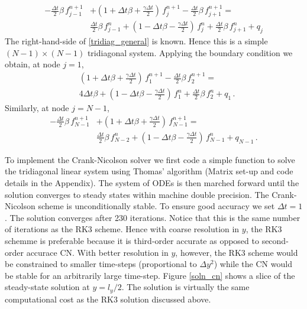 \documentclass[11pt]{article}
\newcommand{\per}{\, .}
\begin{document}
\begin{enumerate}[label=(\alph*)]
        \begin{align}
            \label{tridiag_general}
            -\tfrac{\Delta t}{2}\beta\,f_{j-1}^{n+1} & + \left(1 + \Delta t \beta + \tfrac{\gamma \Delta t}{2}\right)\,f_j^{n+1} -\tfrac{\Delta t}{2}\beta\,f_{j+1}^{n+1} =   \nonumber \\ &\tfrac{\Delta t}{2}\beta\,f_{j-1}^{n}+\left(1 - \Delta t \beta - \tfrac{\gamma \Delta t}{2}\right)\,f_j^{n} + \tfrac{\Delta t}{2}\beta\,f_{j+1}^{n} + q_j
        \end{align}
        The right-hand-side of \eqref{tridiag_general} is known. Hence this is a simple $(N-1)\times(N-1)$ tridiagonal system. Applying the boundary condition we obtain, at node $j=1$,
        \begin{align}
            \label{tridiag_general_1}
            &  \left(1 + \Delta t \beta + \tfrac{\gamma \Delta t}{2}\right)\,f_1^{n+1} -\tfrac{\Delta t}{2}\beta\,f_{2}^{n+1} =   \nonumber \\ &4\Delta t\beta+\left(1 - \Delta t \beta - \tfrac{\gamma \Delta t}{2}\right)\,f_1^{n} + \tfrac{\Delta t}{2}\beta\,f_{2}^{n} + q_1\per
        \end{align}
        Similarly, at node $j=N-1$,
          \begin{align}
            \label{tridiag_general_N1}
            -\tfrac{\Delta t}{2}\beta\,f_{N-1}^{n+1} & + \left(1 + \Delta t \beta + \tfrac{\gamma \Delta t}{2}\right)\,f_{N-1}^{n+1} =   \nonumber \\ &\tfrac{\Delta t}{2}\beta\,f_{N-2}^{n}+\left(1 - \Delta t \beta - \tfrac{\gamma \Delta t}{2}\right)\,f_{N-1}^{n}+ q_{N-1}\per
        \end{align}


        To implement the Crank-Nicolson solver we first code a simple function to solve the tridiagonal linear system using Thomas' algorithm (Matrix set-up and code details in the Appendix). The system of ODEs is then marched forward until the solution converges to steady states within machine double precision. The Crank-Nicolson scheme is unconditionally stable. To ensure good accuracy we set $\Delta t = 1$. The solution converges after 230 iterations. Notice that this is the same number of iterations as the RK3 scheme.  Hence with coarse resolution in $y$, the RK3 schemme is preferable because it is third-order accurate as opposed to second-order accurace CN. With better resolution in $y$, however, the RK3 scheme would be constrained to smaller time-steps (proportional to $\Delta y^2$) while the CN would be  stable for an arbitrarily large time-step.  Figure \ref{soln_cn} shows a slice of the steady-state solution at $y=l_y/2$. The solution is virtually the same computational cost as the RK3 solution discussed above. 



\end{enumerate}
\end{document}
